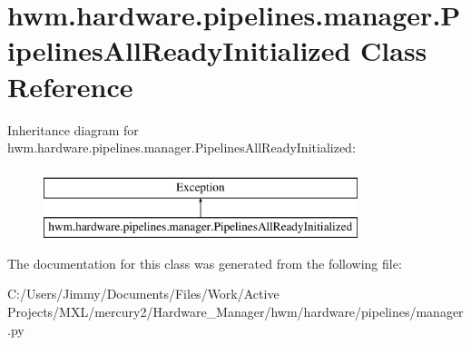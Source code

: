 \hypertarget{classhwm_1_1hardware_1_1pipelines_1_1manager_1_1_pipelines_all_ready_initialized}{\section{hwm.\-hardware.\-pipelines.\-manager.\-Pipelines\-All\-Ready\-Initialized Class Reference}
\label{classhwm_1_1hardware_1_1pipelines_1_1manager_1_1_pipelines_all_ready_initialized}
}
Inheritance diagram for hwm.\-hardware.\-pipelines.\-manager.\-Pipelines\-All\-Ready\-Initialized\-:\begin{figure}[H]
\begin{center}
\leavevmode
\includegraphics[height=2.000000cm]{classhwm_1_1hardware_1_1pipelines_1_1manager_1_1_pipelines_all_ready_initialized}
\end{center}
\end{figure}


The documentation for this class was generated from the following file\-:\begin{DoxyCompactItemize}
\item 
C\-:/\-Users/\-Jimmy/\-Documents/\-Files/\-Work/\-Active Projects/\-M\-X\-L/mercury2/\-Hardware\-\_\-\-Manager/hwm/hardware/pipelines/manager.\-py\end{DoxyCompactItemize}
